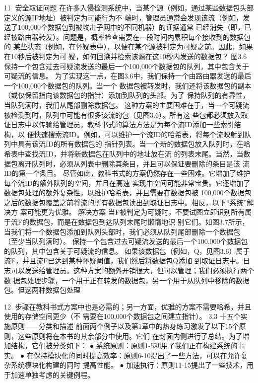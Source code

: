                                                    11
安全取证问题
在许多入侵检测系统中，当某个源（例如，通过某些数据包头部定义的源IP地址）被判定为可能行为不
端时，管理员通常会发现该流（例如，发送了100,000个数据包到被攻击子网中的不同机器）的证据通常
已经消失（即，已经被路由器转发）。问题是，概率检查需要在一段时间内累积每个接收到的数据包的
某些状态（例如，在怀疑表中），以便在某个源被判定为可疑之前。因此，如果在10秒后被判定为可
疑，如何回溯并检索该源在这10秒内发送的数据包？
图3.6
保持一个包含过去可疑流发送的最后一个100,000个数据包的队列，其中包含关于可疑流的信息。
为了实现这一点，在图3.6中，我们保持一个由路由器发送的最后一个100,000个数据包的队列。当一个
数据包被转发时，我们还将该数据包的副本（或仅保留指向该数据包的指针）添加到队列的头部。为了
保持队列的有界性，当队列满时，我们从尾部删除数据包。
这种方案的主要困难在于，当一个可疑流被检测到时，队列中可能有很多该流的包（见图3.6）。所有这
些包都必须放入取证日志中以传输给管理员。教科书式的算法方法是为每个流ID添加一些索引结构，以
便快速搜索流ID。例如，可以维护一个流ID的哈希表，将每个流映射到队列中具有该流ID的所有数据包的
指针列表。当一个新的数据包放入队列时，在哈希表中查找流ID，并将新数据包在队列中的地址放在流
的列表末尾。当然，当数据包离开队列时，必须从列表中删除其条目，并且可以保证要删除的条目是该
流ID的第一个条目。
尽管如此，教科书式的方案仍然存在一些困难。它增加了维护每个流ID的额外队列的空间，并且在高速
实现中空间可能非常宝贵。它还增加了数据包处理的额外复杂性，以维护哈希表，并且需要在数据包被
100,000个数据包之后的数据包覆盖之前将流的所有数据包读出到取证日志中。相反，以下“系统”解决方
案可能更为优雅。
解决方案
当F被判定为可疑时，不要试图立即识别所有属于流F的数据包，而是在数据包到达队列末尾时懒惰地识
别它们。如图3.7所示，当我们将一个数据包添加到队列头部时，我们必须从队列尾部删除一个数据包
（至少当队列满时）。
保持一个包含过去可疑流发送的最后一个100,000个数据包的队列，其中包含关于可疑流的信息。
如果该数据包（例如，Q，见图3.6）属于流F，并且流F已达到某种怀疑阈值，我们然后将数据包Q添加
到取证日志中。日志可以发送给管理员。这种方案的额外开销很大，但可以管理；我们必须执行两个数
据包处理步骤，一个用于正在转发的数据包，另一个用于从队列中移除的数据包。但这两种数据包处理


                                                12
步骤在教科书式方案中也是必需的；另一方面，优雅的方案不需要哈希，并且使用的存储空间更少（不
需要在100,000个数据包之间建立指针）。
3.3 十五个实施原则——分类和描述
前面两个例子以及第1章中的热身练习激发了以下15个原则，这些原则将在本书的其余部分中使用。它们
在封面内侧进行了总结。为了增加结构，它们被分类如下：
 ● 系统原则：原则1-5利用了我们正在构建系统的事实。
 ● 在保持模块化的同时提高效率：原则6-10提出了一些方法，可以在允许复杂系统模块化构建的同时
   提高性能。
 ● 加速执行：原则11-15提出了一些技术，用于加速单独考虑的关键例程。

